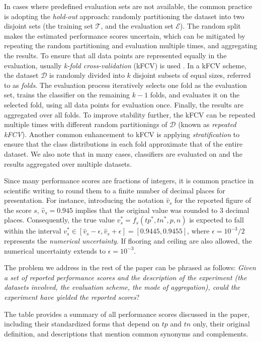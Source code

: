 \documentclass[5p, final]{elsarticle}
\begin{document}
In cases where predefined evaluation sets are not available, the common practice is adopting the \emph{hold-out} approach: randomly partitioning the dataset into two disjoint sets (the training set  $\mathcal{T}$, and the evaluation set $\mathcal{E}$).
The random split makes the estimated performance scores uncertain, which can be mitigated by repeating the random partitioning and evaluation multiple times, and aggregating the results. To ensure that all data points are represented equally in the evaluation, usually \emph{k-fold cross-validation} (kFCV) is used \cite{cv1}.
In a kFCV scheme, the dataset $\mathcal{D}$ is randomly divided into $k$ disjoint subsets of equal sizes, referred to as \emph{folds}. The evaluation process iteratively selects one fold as the evaluation set, trains the classifier on the remaining $k-1$ folds, and evaluates it on the selected fold, using all data points for evaluation once. Finally, the results are aggregated over all folds. 
To improve stability further, the kFCV can be repeated multiple times with different random partitionings of $\mathcal{D}$ (known as \emph{repeated kFCV}). Another common enhancement to kFCV is applying \emph{stratification} to ensure that the class distributions in each fold approximate that of the entire dataset. We also note that in many cases, classifiers are evaluated on and the results aggregated over multiple datasets.

Since many performance scores are fractions of integers, it is common practice in scientific writing to round them to a finite number of decimal places for presentation. For instance, introducing the notation $\hat{v}_s$ for the reported figure of the score $s$, $\hat{v}_s = 0.945$ implies that the original value was rounded to $3$ decimal places. Consequently, the true value $v_s^{*} = f_s(tp^{*}, tn^{*}, p, n)$ is expected to fall within the interval $v_s^{*} \in [\hat{v}_s - \epsilon, \hat{v}_s + \epsilon] = [0.9445, 0.9455]$, where $\epsilon = 10^{-3}/2$ represents the \emph{numerical uncertainty}. If flooring and ceiling are also allowed, the numerical uncertainty extends to $\epsilon = 10^{-3}$.

The problem we address in the rest of the paper can be phrased as follows: \emph{Given a set of reported performance scores and the description of the experiment (the datasets involved, the evaluation scheme, the mode of aggregation), could the experiment have yielded the reported scores}?

\begin{table}
\caption{The table provides a summary of all performance scores discussed in the paper, including their standardized forms that depend on $tp$ and $tn$ only, their original definition, and descriptions that mention common synonyms and complements.}
\label{tab:scores}
\begin{scriptsize}
\begingroup
\renewcommand{\arraystretch}{3.0}

\endgroup
\end{scriptsize}
\end{table}
\end{document}
